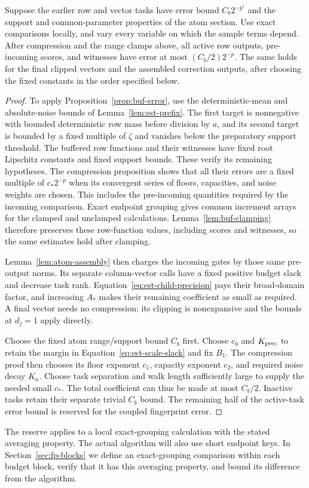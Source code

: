 \begin{proposition}\label{prop:est-clean}
Suppose the earlier row and vector tasks have error bound $C_b2^{-p'}$
and the support and common-parameter properties of the atom section.
Use exact comparisons locally, and vary every variable on which the
sample terms depend.  After compression and the range clamps above, all
active row outputs, pre-incoming scores, and witnesses have error at most
$(C_b/2)2^{-p}$.  The same holds for the final clipped vectors and the
assembled correction outputs, after choosing the fixed constants in the
order specified below.
\end{proposition}
\begin{proof}
To apply Proposition~\ref{prop:buf-error}, use the deterministic-mean and
absolute-noise bounds of Lemma~\ref{lem:est-prefix}.  The first target
is nonnegative with bounded deterministic row mass before division by
$a$, and its second target is bounded by a fixed multiple of $\zeta$ and
vanishes below the preparatory support threshold.  The buffered row
functions and their witnesses have fixed root Lipschitz constants and
fixed support bounds.  These verify its remaining hypotheses.  The
compression proposition shows that all their errors are a fixed multiple
of $c_*2^{-p}$ when its convergent series of
floors, capacities, and noise weights are chosen.  This includes the
pre-incoming quantities required by the incoming comparison.
Exact endpoint grouping gives common increment arrays for the clamped
and unclamped calculations.  Lemma~\ref{lem:buf-clamping} therefore
preserves these row-function values, including scores and witnesses,
so the same estimates hold after clamping.

Lemma~\ref{lem:atom-assembly} then charges the incoming gates by those
same pre-output norms.  Its separate column-vector calls have a fixed
positive budget slack and decrease task rank.  Equation~\eqref{eq:est-child-precision}
pays their broad-domain factor, and increasing $A_*$ makes their remaining
coefficient as small as required.  A final vector needs no compression;
its clipping is nonexpansive and the bounds at $d_j=1$ apply directly.

Choose the fixed atom range/support bound $C_b$ first.  Choose $c_0$ and
$K_{\rm prec}$ to retain the margin in Equation~\eqref{eq:est-scale-slack}
and fix $B_1$.  The
compression proof then chooses its floor exponent $c_1$, capacity exponent
$c_2$, and required noise decay $K_n$.  Choose task separation and walk
length sufficiently large to supply the needed small $c_*$.  The total
coefficient can thus be made at most $C_b/2$.  Inactive tasks retain their
separate trivial $C_b$ bound.  The remaining half of the active-task
error bound is reserved for the coupled fingerprint error.
\end{proof}

The reserve applies to a local exact-grouping calculation with the stated
averaging property.  The actual algorithm will also use short endpoint
keys.  In Section~\ref{sec:fp-blocks} we define an exact-grouping comparison
within each budget block, verify that it has this averaging property, and
bound its difference from the algorithm.
